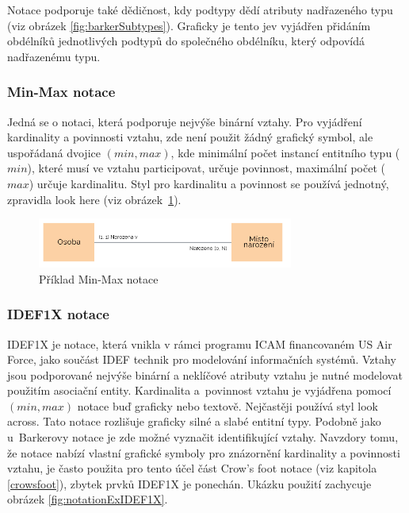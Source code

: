 \documentclass[czech,bachelor,public,dept460,male,oneside]{diploma}
\begin{document}
		Notace podporuje také dědičnost, kdy podtypy dědí atributy nadřazeného typu (viz obrázek \ref{fig:barkerSubtypes}). Graficky je tento jev vyjádřen přidáním obdélníků jednotlivých podtypů do společného obdélníku, který odpovídá nadřazenému typu.
		
		\subsubsection{Min-Max notace} \label{minmax}
		Jedná se o notaci, která podporuje nejvýše binární vztahy. Pro vyjádření kardinality a povinnosti vztahu, zde není použit žádný grafický symbol, ale uspořádaná dvojice $(min, max)$, kde minimální počet instancí entitního typu ($min$), které musí ve vztahu participovat, určuje povinnost, maximální počet ($max$) určuje kardinalitu. Styl pro kardinalitu a povinnost se používá jednotný, zpravidla look here (viz obrázek~\ref{fig:notationExMinMax}).
		
		\begin{figure}[!h]
			\centering
			\includegraphics[width=0.75\textwidth]{Figures/NotationExMinMax}
			\caption[Příklad Min-Max notace]{Příklad Min-Max notace \cite{whatIsERD}}
			\label{fig:notationExMinMax}
		\end{figure}
	
		\subsubsection{IDEF1X notace} \label{idef1x}
		IDEF1X \cite{compErNotations} je notace, která vnikla v rámci programu ICAM financovaném US Air Force, jako součást IDEF technik pro modelování informačních systémů. Vztahy jsou podporované nejvýše binární a neklíčové atributy vztahu je nutné modelovat použitím asociační entity. Kardinalita a~povinnost vztahu je vyjádřena pomocí $(min, max)$ notace buď graficky nebo textově. Nejčastěji používá styl look across. Tato notace rozlišuje graficky silné a slabé entitní typy. Podobně jako u~Barkerovy notace je zde možné vyznačit identifikující vztahy. Navzdory tomu, že notace nabízí vlastní grafické symboly pro znázornění kardinality a povinnosti vztahu, je často použita pro tento účel část Crow's foot notace (viz kapitola \ref{crowsfoot}), zbytek prvků IDEF1X je ponechán. Ukázku použití zachycuje obrázek \ref{fig:notationExIDEF1X}.
		
\end{document}
